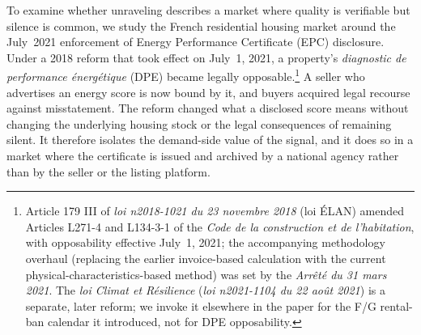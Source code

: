 To examine whether unraveling describes a market where quality is verifiable but silence is
common, we study the French residential housing market around the July~2021 enforcement of
Energy Performance Certificate (EPC) disclosure. Under a 2018 reform that took effect on
July~1, 2021, a property's \emph{diagnostic de performance \'energ\'etique} (DPE) became
legally opposable.\footnote{Article 179 III of \emph{loi n\textdegree{}2018-1021 du 23 novembre
2018} (loi \'ELAN) amended Articles L271-4 and L134-3-1 of the \emph{Code de la construction et
de l'habitation}, with opposability effective July~1, 2021; the accompanying methodology
overhaul (replacing the earlier invoice-based calculation with the current
physical-characteristics-based method) was set by the \emph{Arr\^et\'e du 31 mars 2021}. The
\emph{loi Climat et R\'esilience} (\emph{loi n\textdegree{}2021-1104 du 22 ao\^ut 2021}) is a
separate, later reform; we invoke it elsewhere in the paper for the F/G rental-ban calendar it
introduced, not for DPE opposability.} A seller who advertises an energy score is now bound by
it, and buyers acquired legal recourse against misstatement. The reform changed what a disclosed
score means without changing the underlying housing stock or the legal consequences of remaining
silent. It therefore isolates the demand-side value of the signal, and it does so in a market
where the certificate is issued and archived by a national agency rather than by the seller or
the listing platform.
